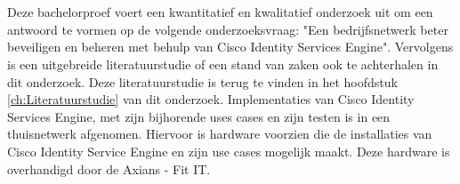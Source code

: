 
\chapter{}
\label{ch:methodologie}


Deze bachelorproef voert een kwantitatief en kwalitatief onderzoek uit om een antwoord te vormen op de volgende onderzoeksvraag: "Een bedrijfsnetwerk beter beveiligen en beheren met behulp van Cisco Identity Services Engine". 
\newline
\newline
Vervolgens is een uitgebreide literatuurstudie of een stand van zaken ook te achterhalen in dit onderzoek. Deze literatuurstudie is terug te vinden in het hoofdstuk \ref{ch:Literatuurstudie} van dit onderzoek. Implementaties van Cisco Identity Services Engine, met zijn bijhorende uses cases en zijn testen is in een thuisnetwerk afgenomen. Hiervoor is hardware voorzien die de installaties van Cisco Identity Service Engine en zijn use cases mogelijk maakt. Deze hardware is overhandigd door de Axians - Fit IT.
\newline
\newline
